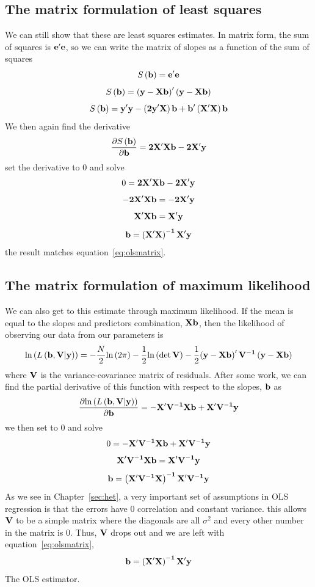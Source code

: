 \subsection{The matrix formulation of least squares}

We can still show that these are least squares estimates. In matrix form, the sum of squares is $\bf e'e$, so we can write the matrix of slopes as a function of the sum of squares
\[
S\left({\bf b}\right)={\bf e'e}
\]
\[
S\left({\bf b}\right)={\bf \left(y-Xb\right)'\left(y-Xb\right)}
\]
\begin{equation}
S\left({\bf b}\right)={\bf y'y-\left(2y'X\right)b+b'\left(X'X\right)b}
\end{equation}
We then again find the derivative
\begin{equation}
\frac{\partial S\left({\bf b}\right)}{\partial {\bf b}}={\bf 2X'Xb-2X'y}
\end{equation}
set the derivative to 0 and solve
\[
0={\bf 2X'Xb-2X'y}
\]
\[
{\bf -2X'Xb}={\bf -2X'y}
\]
\[
{\bf X'Xb}={\bf X'y}
\]
\[
{\bf b}={\bf \left(X'X\right)^{-1}X'y}
\]
the result matches equation~\eqref{eq:olsmatrix}.

\subsection{The matrix formulation of maximum likelihood}
\label{sec:regml}

We can also get to this estimate through maximum likelihood. If the mean is equal to the slopes and predictors combination, $\bf Xb$, then the likelihood of observing our data from our parameters is
\begin{equation}
\mbox{ln}\left(L\left({\bf b, V \vert \bf y}\right)\right)=-\frac{N}{2}\mbox{ln}\left(2\pi\right)-\frac{1}{2}\mbox{ln}\left(\det{\bf V}\right)-\frac{1}{2}{\bf \left(y-Xb\right)'V^{-1}\left(y-Xb\right)}
\end{equation}
 where $\bf V$ is the variance-covariance matrix of residuals. After some work, we can find the partial derivative of this function with respect to the slopes, $\bf b$ as
\begin{equation}
\frac{\partial\mbox{ln}\left(L\left({\bf b, V \vert \bf y}\right)\right)}{\partial \bf b} = {\bf -X'V^{-1}Xb+X'V^{-1}y}
\end{equation}
we then set to 0 and solve
\[
0= {\bf -X'V^{-1}Xb+X'V^{-1}y}
\]
\[
{\bf X'V^{-1}Xb}= {\bf X'V^{-1}y}
\]
\[
{\bf b}= {\bf \left(X'V^{-1}X\right)^{-1}X'V^{-1}y}
\]
As we see in Chapter~\ref{sec:het}, a very important set of assumptions in OLS regression is that the errors have 0 correlation and constant variance. this allows $\bf V$ to be a simple matrix where the diagonals are all $\sigma^2$ and every other number in the matrix is 0. Thus, $\bf V$ drops out and we are left with equation~\eqref{eq:olsmatrix},
\[
{\bf b}={\bf \left(X'X\right)^{-1}X'y}
\]
 The OLS estimator.

